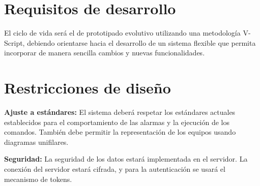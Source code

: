 \section{Requisitos de desarrollo}
El ciclo de vida será el de prototipado evolutivo utilizando una metodología V-Script, debiendo orientarse hacia el desarrollo de un sistema flexible que permita incorporar de manera sencilla cambios y nuevas funcionalidades.

\section{Restricciones de diseño}
\textbf{Ajuste a estándares:} El sistema deberá respetar los estándares actuales establecidos para el comportamiento de las alarmas y la ejecución de los comandos. También debe permitir la representación de los equipos usando diagramas unifilares.

\textbf{Seguridad:} La seguridad de los datos estará implementada en el servidor. La conexión del servidor estará cifrada, y para la autenticación se usará el mecanismo de tokens.


